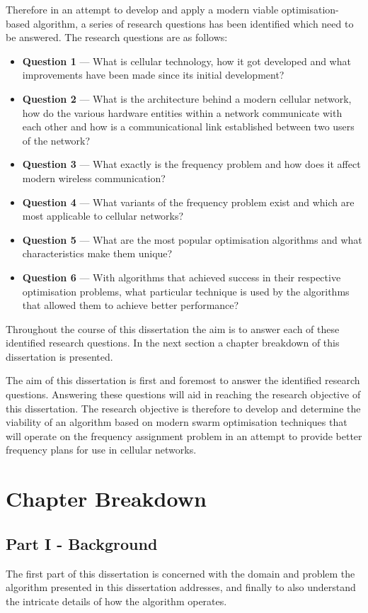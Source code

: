 Therefore in an attempt to develop and apply a modern viable optimisation-based algorithm, a series of research questions has been identified which need to be answered. The research questions are as follows:
\begin{itemize}
\item \textbf{Question 1} --- What is cellular technology, how it got developed and what improvements have been made since its initial development?
\item \textbf{Question 2} --- What is the architecture behind a modern cellular network, how do the various hardware entities within a network communicate with each other and how is a communicational link established between two users of the network?
\item \textbf{Question 3} --- What exactly is the frequency problem and how does it affect modern wireless communication?
\item \textbf{Question 4} --- What variants of the frequency problem exist and which are most applicable to cellular networks?
\item \textbf{Question 5} --- What are the most popular optimisation algorithms and what characteristics make them unique?
\item \textbf{Question 6} --- With algorithms that achieved success in their respective optimisation problems, what particular technique is used by the algorithms that allowed them to achieve better performance?
\end{itemize}

Throughout the course of this dissertation the aim is to answer each of these identified research questions. In the next section a chapter breakdown of this dissertation is presented.

The aim of this dissertation is first and foremost to answer the identified research questions. Answering these questions will aid in reaching the research objective of this dissertation. The research objective is therefore to develop and determine the viability of an algorithm based on modern swarm optimisation techniques that will operate on the frequency assignment problem in an attempt to provide better frequency plans for use in cellular networks.

\section {Chapter Breakdown}
\subsection{Part I - Background}
The first part of this dissertation is concerned with the domain and problem the algorithm presented in this dissertation addresses, and finally to also understand the intricate details of how the algorithm operates.

